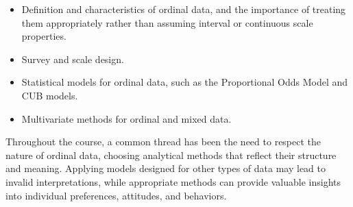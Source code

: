 \documentclass[
  letterpaper,
  DIV=11,
  numbers=noendperiod]{scrartcl}
\begin{document}
\begin{itemize}
\item
  Definition and characteristics of ordinal data, and the importance of
  treating them appropriately rather than assuming interval or
  continuous scale properties.
\item
  Survey and scale design.
\item
  Statistical models for ordinal data, such as the Proportional Odds
  Model and CUB models.
\item
  Multivariate methods for ordinal and mixed data.
\end{itemize}

Throughout the course, a common thread has been the need to respect the
nature of ordinal data, choosing analytical methods that reflect their
structure and meaning. Applying models designed for other types of data
may lead to invalid interpretations, while appropriate methods can
provide valuable insights into individual preferences, attitudes, and
behaviors.
\end{document}

